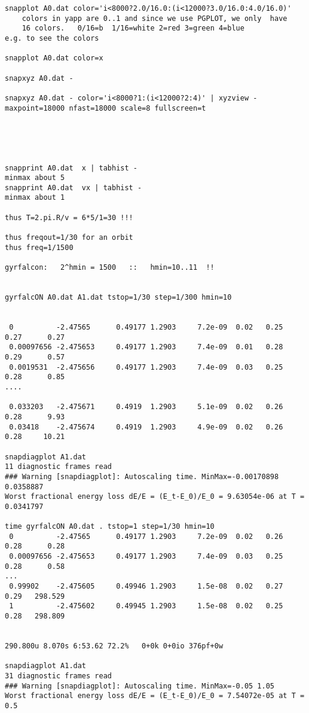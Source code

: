 {\begin{verbatim}
snapplot A0.dat color='i<8000?2.0/16.0:(i<12000?3.0/16.0:4.0/16.0)'
    colors in yapp are 0..1 and since we use PGPLOT, we only  have
    16 colors.   0/16=b  1/16=white 2=red 3=green 4=blue
e.g. to see the colors

snapplot A0.dat color=x

snapxyz A0.dat - 

snapxyz A0.dat - color='i<8000?1:(i<12000?2:4)' | xyzview - maxpoint=18000 nfast=18000 scale=8 fullscreen=t





snapprint A0.dat  x | tabhist -
minmax about 5
snapprint A0.dat  vx | tabhist -
minmax about 1

thus T=2.pi.R/v = 6*5/1=30 !!!

thus freqout=1/30 for an orbit
thus freq=1/1500 

gyrfalcon:   2^hmin = 1500   ::   hmin=10..11  !!


gyrfalcON A0.dat A1.dat tstop=1/30 step=1/300 hmin=10


 0          -2.47565      0.49177 1.2903     7.2e-09  0.02   0.25       0.27      0.27
 0.00097656 -2.475653     0.49177 1.2903     7.4e-09  0.01   0.28       0.29      0.57
 0.0019531  -2.475656     0.49177 1.2903     7.4e-09  0.03   0.25       0.28      0.85
....

 0.033203   -2.475671     0.4919  1.2903     5.1e-09  0.02   0.26       0.28      9.93
 0.03418    -2.475674     0.4919  1.2903     4.9e-09  0.02   0.26       0.28     10.21

snapdiagplot A1.dat
11 diagnostic frames read
### Warning [snapdiagplot]: Autoscaling time. MinMax=-0.00170898 0.0358887
Worst fractional energy loss dE/E = (E_t-E_0)/E_0 = 9.63054e-06 at T = 0.0341797

time gyrfalcON A0.dat . tstop=1 step=1/30 hmin=10
 0          -2.47565      0.49177 1.2903     7.2e-09  0.02   0.26       0.28      0.28
 0.00097656 -2.475653     0.49177 1.2903     7.4e-09  0.03   0.25       0.28      0.58
...
 0.99902    -2.475605     0.49946 1.2903     1.5e-08  0.02   0.27       0.29   298.529
 1          -2.475602     0.49945 1.2903     1.5e-08  0.02   0.25       0.28   298.809


290.800u 8.070s 6:53.62 72.2%   0+0k 0+0io 376pf+0w

snapdiagplot A1.dat
31 diagnostic frames read
### Warning [snapdiagplot]: Autoscaling time. MinMax=-0.05 1.05
Worst fractional energy loss dE/E = (E_t-E_0)/E_0 = 7.54072e-05 at T = 0.5




\end{verbatim}}
